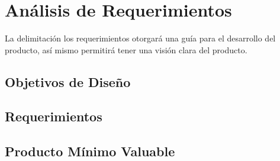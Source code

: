 \section{Análisis de Requerimientos}
\noindent La delimitación los requerimientos otorgará una guía para el desarrollo del producto, así
\noindent mismo permitirá tener una visión clara del producto.
\subsection {Objetivos de Diseño}
\subsection {Requerimientos}
\subsection {Producto Mínimo Valuable}

